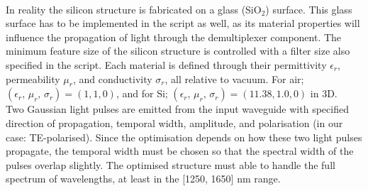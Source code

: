 \\
In reality the silicon structure is fabricated on a glass (SiO$_2$) surface. This glass surface has to be implemented in the script as well, as its material properties will influence the propagation of light through the demultiplexer component. The minimum feature size of the silicon structure is controlled with a filter size also specified in the script. Each material is defined through their permittivity $\epsilon_r$, permeability $\mu_r$, and conductivity $\sigma_r$, all relative to vacuum. For air; $(\epsilon_r, \, \mu_r, \, \sigma_r)=(1,1,0)$, and for Si; $(\epsilon_r, \, \mu_r, \, \sigma_r)=(11.38,1.0,0)$ in 3D. \\ 

Two Gaussian light pulses are emitted from the input waveguide with specified direction of propagation, temporal width, amplitude, and polarisation (in our case: TE-polarised). Since the optimisation depends on how these two light pulses propagate, the temporal width must be chosen so that the spectral width of the pulses overlap slightly. The optimised structure must able to handle the full spectrum of wavelengths, at least in the [1250, 1650] nm range.
\\\\

